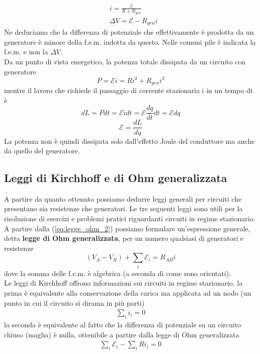 \documentclass[
10pt, %
a4paper, %
oneside, %
headinclude,footinclude, %
BCOR5mm, %
]{scrartcl}
\begin{document}
\begin{align}\label{eq:legge_ohm_2}
	&i = \frac{\mathcal{E}}{R+R_{gen}}\nonumber \\
	&\Delta V = \mathcal{E}-R_{gen}i
\end{align}
Ne deduciamo che la differenza di potenziale che effettivamente è prodotta da un generatore è minore della f.e.m. indotta da questo. Nelle comuni pile è indicata la f.e.m. e non la $\Delta V$.\\
Da un punto di vista energetico, la potenza totale dissipata da un circuito con generatore
\[P = \mathcal{E} i = R i^2 + R_{gen}i^2\]
mentre il lavoro che richiede il passaggio di corrente stazionaria i in un tempo dt è 
\[dL = P dt =\mathcal{E} i dt= \mathcal{E}\frac{dq}{dt}dt=\mathcal{E} dq \]
\[\mathcal{E} = \frac{dL}{dq}\]
La potenza non è quindi dissipata solo dall'effetto Joule del conduttore ma anche da quello del generatore. 
\subsection{Leggi di Kirchhoff e di Ohm generalizzata}
A partire da quanto ottenuto possiamo dedurre leggi generali per circuiti che presentano sia resistenze che generatori. Le tre seguenti leggi sono utili per la risoluzione di esercizi e problemi pratici riguardanti circuiti in regime stazionario.\\
A partire dalla (\ref{eq:legge_ohm_2})  possiamo formulare un'espressione generale, detta \textbf{legge di Ohm generalizzata}, per un numero qualsiasi di generatori e resistenze
\[(V_A-V_B)+\sum_{i} \mathcal{E}_i = R_{AB}i \]
dove la somma delle f.e.m. è algebrica (a seconda di come sono orientati).\\
Le leggi di Kirchhoff offrono informazioni sui circuiti in regime stazionario, la prima è equivalente alla conservazione della carica ma applicata ad un nodo (un punto in cui il circuito si dirama in più parti)
\begin{align*}
	\sum_i i_i = 0
\end{align*}
la seconda è equivalente al fatto che la differenza di potenziale su un circuito chiuso (maglia) è nulla, ottenibile a partire dalla legge di Ohm generalizzata
\begin{align*}
	\sum_i \mathcal{E}_i -\sum_i R i_i =0
\end{align*}
\end{document}
